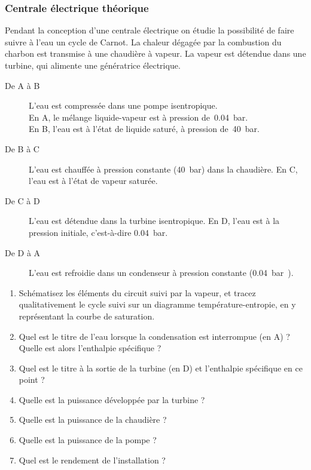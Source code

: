 \subsubsection{Centrale électrique théorique}
	
	Pendant la conception d’une centrale électrique on étudie la possibilité de faire suivre à l’eau un cycle de Carnot. La chaleur dégagée par la combustion du charbon est transmise à une chaudière à vapeur. La vapeur est détendue dans une turbine, qui alimente une génératrice électrique. 

	\begin{description}
		\item[De A à B] L’eau est compressée dans une pompe isentropique.\\
			En A, le mélange liquide-vapeur est à pression de~\SI{0,04}{\bar}.\\
			En B, l’eau est à l’état de liquide saturé, à pression de~\SI{40}{\bar}.
		\item[De B à C] L’eau est chauffée à pression constante (\SI{40}{\bar}) dans la chaudière. 
			En C, l’eau est à l’état de vapeur saturée.
		\item[De C à D] L’eau est détendue dans la turbine isentropique. 
			En D, l’eau est à la pression initiale, c’est-à-dire \SI{0,04}{\bar}.
		\item[De D à A] L’eau est refroidie dans un condenseur à pression constante (\SI{0,04} bar).
	\end{description}

\begin{enumerate}
	\item Schématisez les éléments du circuit suivi par la vapeur, et tracez qualitativement le cycle suivi sur un diagramme température-entropie, en y représentant la courbe de saturation.
	\item Quel est le titre de l’eau lorsque la condensation est interrompue (en A) ? Quelle est alors l’enthalpie spécifique ?
	\item Quel est le titre à la sortie de la turbine (en D) et l’enthalpie spécifique en ce point ?
	\item Quelle est la puissance développée par la turbine ?
	\item Quelle est la puissance de la chaudière ?
	\item Quelle est la puissance de la pompe ?
	\item Quel est le rendement de l’installation ?
\end{enumerate}

